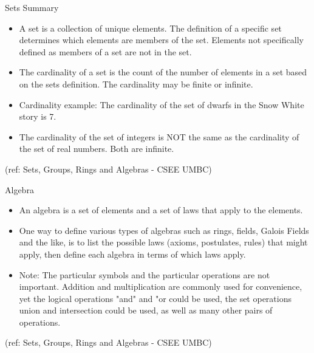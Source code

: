 \begin{frame}{Sets Summary}
\begin{itemize}
\item  A set is a collection of unique elements.
  The definition of a specific set determines which elements
  are members of the set.
  Elements not specifically defined as members of a set are not
  in the set.

\item The cardinality of a set is the count of the number of elements
  in a set based on the sets definition. The cardinality may be
  finite or infinite.

\item Cardinality example: The cardinality of the set of dwarfs in
  the Snow White story is 7.

\item The cardinality of the set of integers is NOT the same as the
  cardinality of the set of real numbers. Both are infinite.
\end{itemize}

\tiny{(ref: Sets, Groups, Rings and Algebras - CSEE UMBC)}

\end{frame}

\begin{frame}{Algebra}

\begin{itemize}
\item  An algebra is a set of elements and a set of laws that apply to the elements.

\item One way to define various types of algebras such as rings, fields, Galois
Fields and the like, is to list the possible laws (axioms, postulates, rules)
that might apply, then define each algebra in terms of which laws apply.

\item Note: The particular symbols and the particular operations are not important.
      Addition and multiplication are commonly used for convenience, yet the
      logical operations "and" and "or could be used, the set operations
      union and intersection could be used, as well as many other pairs of
      operations.
\end{itemize}


\tiny{(ref: Sets, Groups, Rings and Algebras - CSEE UMBC)}

\end{frame}

